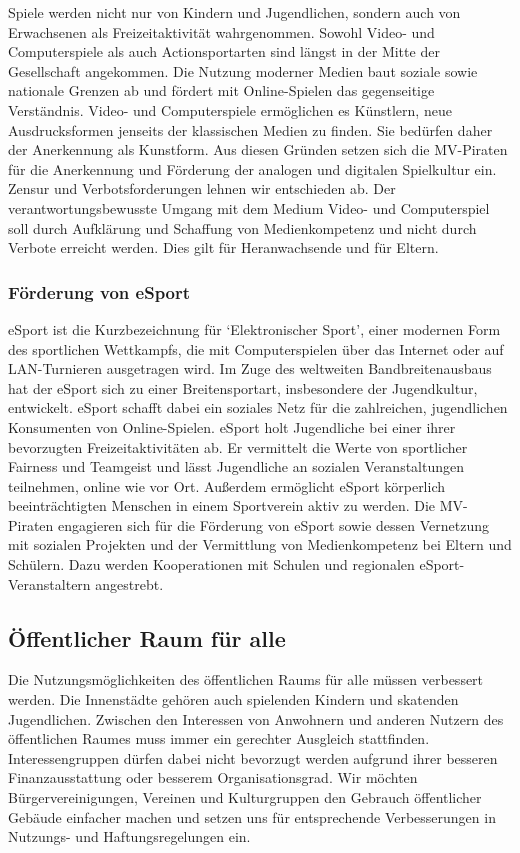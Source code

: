 Spiele werden nicht nur von Kindern und Jugendlichen, sondern auch von Erwachsenen als Freizeitaktivität wahrgenommen. Sowohl Video- und Computerspiele als auch Actionsportarten sind längst in der Mitte der Gesellschaft angekommen. Die Nutzung moderner Medien baut soziale sowie nationale Grenzen ab und fördert mit Online-Spielen das gegenseitige Verständnis. Video- und Computerspiele ermöglichen es Künstlern, neue Ausdrucksformen jenseits der klassischen Medien zu finden. Sie bedürfen daher der Anerkennung als Kunstform. Aus diesen Gründen setzen sich die MV-Piraten für die Anerkennung und Förderung der analogen und digitalen Spielkultur ein. Zensur und Verbotsforderungen lehnen wir entschieden ab. Der verantwortungsbewusste Umgang mit dem Medium Video- und Computerspiel soll durch Aufklärung und Schaffung von Medienkompetenz und nicht durch Verbote erreicht werden. Dies gilt für Heranwachsende und für Eltern.

\subsubsection{Förderung von eSport}

eSport ist die Kurzbezeichnung für `Elektronischer Sport', einer modernen Form des sportlichen Wettkampfs, die mit Computerspielen über das Internet oder auf LAN-Turnieren ausgetragen wird. Im Zuge des weltweiten Bandbreitenausbaus hat der eSport sich zu einer Breitensportart, insbesondere der Jugendkultur, entwickelt. eSport schafft dabei ein soziales Netz für die zahlreichen, jugendlichen Konsumenten von Online-Spielen. eSport holt Jugendliche bei einer ihrer bevorzugten Freizeitaktivitäten ab. Er vermittelt die Werte von sportlicher Fairness und Teamgeist und lässt Jugendliche an sozialen Veranstaltungen teilnehmen, online wie vor Ort. Außerdem ermöglicht eSport körperlich beeinträchtigten Menschen in einem Sportverein aktiv zu werden. Die MV-Piraten engagieren sich für die Förderung von eSport sowie dessen Vernetzung mit sozialen Projekten und der Vermittlung von Medienkompetenz bei Eltern und Schülern. Dazu werden Kooperationen mit Schulen und regionalen eSport-Veranstaltern angestrebt.

\subsection{Öffentlicher Raum für alle}

Die Nutzungsmöglichkeiten des öffentlichen Raums für alle müssen verbessert werden. Die Innenstädte gehören auch spielenden Kindern und skatenden Jugendlichen. Zwischen den Interessen von Anwohnern und anderen Nutzern des öffentlichen Raumes muss immer ein gerechter Ausgleich stattfinden. Interessengruppen dürfen dabei nicht bevorzugt werden aufgrund ihrer besseren Finanzausstattung oder besserem Organisationsgrad. Wir möchten Bürgervereinigungen, Vereinen und Kulturgruppen den Gebrauch öffentlicher Gebäude einfacher machen und setzen uns für entsprechende Verbesserungen in Nutzungs- und Haftungsregelungen ein.

